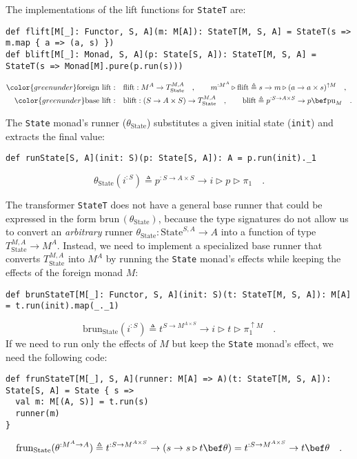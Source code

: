 The implementations of the lift functions for \lstinline!StateT!
are:
\begin{lstlisting}
def flift[M[_]: Functor, S, A](m: M[A]): StateT[M, S, A] = StateT(s => m.map { a => (a, s) })
def blift[M[_]: Monad, S, A](p: State[S, A]): StateT[M, S, A] = StateT(s => Monad[M].pure(p.run(s)))
\end{lstlisting}
\begin{align*}
{\color{greenunder}\text{foreign lift}:}\quad & \text{flift}:M^{A}\rightarrow T_{\text{State}}^{M,A}\quad,\quad\quad m^{:M^{A}}\triangleright\text{flift}\triangleq s\rightarrow m\triangleright(a\rightarrow a\times s)^{\uparrow M}\quad,\\
{\color{greenunder}\text{base lift}:}\quad & \text{blift}:(S\rightarrow A\times S)\rightarrow T_{\text{State}}^{M,A}\quad,\quad\quad\text{blift}\triangleq p^{:S\rightarrow A\times S}\rightarrow p\bef\text{pu}_{M}\quad.
\end{align*}

The \lstinline!State! monad\textsf{'}s runner ($\theta_{\text{State}}$) substitutes
a given initial state (\lstinline!init!) and extracts the final value:
\begin{lstlisting}
def runState[S, A](init: S)(p: State[S, A]): A = p.run(init)._1
\end{lstlisting}
\[
\theta_{\text{State}}(i^{:S})\triangleq p^{:S\rightarrow A\times S}\rightarrow i\triangleright p\triangleright\pi_{1}\quad.
\]

The transformer \lstinline!StateT! does not have a general base runner
that could be expressed in the form $\text{brun}\,(\theta_{\text{State}})$,
because the type signatures do not allow us to convert an \emph{arbitrary}
runner $\theta_{\text{State}}:\text{State}^{S,A}\rightarrow A$ into
a function of type $T_{\text{State}}^{M,A}\rightarrow M^{A}$. Instead,
we need to implement a specialized base runner that converts $T_{\text{State}}^{M,A}$
into $M^{A}$ by running the \lstinline!State! monad\textsf{'}s effects while
keeping the effects of the foreign monad $M$:
\begin{lstlisting}
def brunStateT[M[_]: Functor, S, A](init: S)(t: StateT[M, S, A]): M[A] = t.run(init).map(_._1)
\end{lstlisting}
\[
\text{brun}_{\text{State}}(i^{:S})\triangleq t^{S\rightarrow M^{A\times S}}\rightarrow i\triangleright t\triangleright\pi_{1}^{\uparrow M}\quad.
\]
If we need to run only the effects of $M$ but keep the \lstinline!State!
monad\textsf{'}s effect, we need the following code:
\begin{lstlisting}
def frunStateT[M[_], S, A](runner: M[A] => A)(t: StateT[M, S, A]): State[S, A] = State { s =>
  val m: M[(A, S)] = t.run(s)
  runner(m)
}
\end{lstlisting}
\[
\text{frun}_{\text{State}}(\theta^{:M^{A}\rightarrow A})\triangleq t^{:S\rightarrow M^{A\times S}}\rightarrow\left(s\rightarrow s\triangleright t\bef\theta\right)=t^{:S\rightarrow M^{A\times S}}\rightarrow t\bef\theta\quad.
\]


